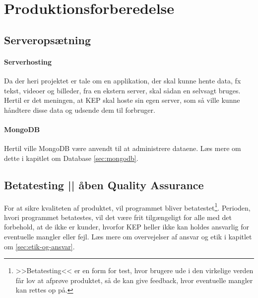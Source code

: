 \section{Produktionsforberedelse \label{sec:produktionsforberedelse}}
\subsection{Serveropsætning \label{sec:serveropsætning}}
\paragraph{Serverhosting} Da der heri projektet er tale om en applikation, der skal kunne hente data, fx tekst, videoer og billeder, fra en ekstern server, skal sådan en selvsagt bruges. Hertil er det meningen, at KEP skal hoste sin egen server, som så ville kunne håndtere disse data og udsende dem til forbruger. 
\paragraph{MongoDB}
Hertil ville MongoDB være anvendt til at administrere dataene. Læs mere om dette i kapitlet om Database \ref{sec:mongodb}.
\subsection{Betatesting || åben Quality Assurance}
For at sikre kvaliteten af produktet, vil programmet bliver betatestet\footnote{>>Betatesting<< er en form for test, hvor brugere ude i den virkelige verden får lov at afprøve produktet, så de kan give feedback, hvor eventuelle mangler kan rettes op på.}. Perioden, hvori programmet betatestes, vil det være frit tilgængeligt for alle med det forbehold, at de ikke er kunder, hvorfor KEP heller ikke kan holdes ansvarlig for eventuelle mangler eller fejl. Læs mere om overvejelser af ansvar og etik i kapitlet om \ref{sec:etik-og-ansvar}.